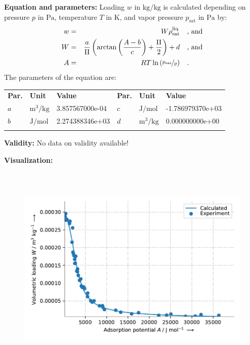 \textbf{Equation and parameters:}
\newline
%
Loading $w$ in $\si{\kilogram\per\kilogram}$ is calculated depending on pressure $p$ in $\si{\pascal}$, temperature $T$ in $\si{\kelvin}$, and vapor pressure $p_\mathrm{sat}$ in $\si{\pascal}$ by:
%
\begin{equation*}
\begin{split}
w &=& W \rho_\mathrm{sat}^{\mathrm{liq}} & \quad\text{, and} \\
W &=& \frac{a}{\Pi} \left( \arctan \left( \frac{A - b}{c} \right) + \frac{\Pi}{2}\right) + d & \quad\text{, and} \\
A &=& R T \ln \left( \nicefrac{p_\mathrm{sat}}{p} \right) & \quad\text{.} \\
\end{split}
\end{equation*}
%
The parameters of the equation are:
%
\begin{longtable}[l]{lll|lll}
\toprule
\addlinespace
\textbf{Par.} & \textbf{Unit} & \textbf{Value} &	\textbf{Par.} & \textbf{Unit} & \textbf{Value} \\
\addlinespace
\midrule
\endhead

\bottomrule
\endfoot
\bottomrule
\endlastfoot
\addlinespace

$a$ & $\si{\cubic\meter\per\kilogram}$ & 3.857567000e-04 & $c$ & $\si{\joule\per\mole}$ & -1.786979370e+03 \\
$b$ & $\si{\joule\per\mole}$ & 2.274388346e+03 & $d$ & $\si{\cubic\meter\per\kilogram}$ & 0.000000000e+00 \\

\addlinespace\end{longtable}

\textbf{Validity:}
\newline
No data on validity available!
\newline

\textbf{Visualization:}
%
\begin{figure}[!htp]
{\noindent\includegraphics[height=10cm, keepaspectratio]{figs/ads/ads_Water_silica_gel_pellet_Fuji_DubininArctan1_1.pdf}}
\end{figure}
%

